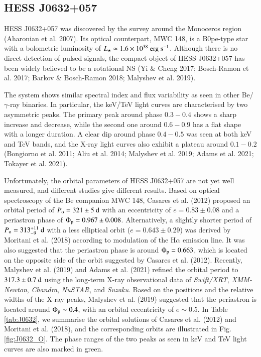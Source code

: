 \documentclass{aa}
\def\HESSJ0632{HESS J0632+057}
\begin{document}
\subsection{\HESSJ0632}
\HESSJ0632 was discovered by the survey around the Monoceros region (Aharonian et al. 2007). Its optical counterpart, MWC 148, is a B0pe-type star with a bolometric luminosity of $L_{\star}\simeq1.6\times10^{38}\ {\rm erg\ s^{-1}}$.
Although there is no direct detection of pulsed signals, the compact object of \HESSJ0632 has been widely believed to be a rotational NS (Yi \& Cheng 2017; Bosch-Ramon et al. 2017; Barkov \& Bosch-Ramon 2018; Malyshev et al. 2019).

The system shows similar spectral index and flux variability as seen in other Be/$\gamma$-ray binaries. In particular, the keV/TeV light curves are characterised by two asymmetric peaks. The primary peak around phase $0.3-0.4$ shows a sharp increase and decrease, while the second one around $0.6-0.9$ has a flat shape with a longer duration. A clear dip around phase $0.4-0.5$ was seen at both keV and TeV bands, and the X-ray light curves also exhibit a plateau around $0.1-0.2$ (Bongiorno et al. 2011; Aliu et al. 2014; Malyshev et al. 2019; Adams et al. 2021; Tokayer et al. 2021).

Unfortunately, the orbital parameters of \HESSJ0632 are not
yet well measured, and different studies give different results.
Based on optical spectroscopy of the Be companion MWC 148, Casares et al. (2012) proposed an orbital period of $P_{\rm o}=321\pm5\ \rm{d}$ with an eccentricity of $e=0.83\pm0.08$ and a periastron phase of $\Phi_{\rm p}=0.967\pm0.008$. Alternatively, a slightly shorter period of $P_{\rm o}=313^{+11}_{-9}\ \rm{d}$ with a less elliptical orbit ($e=0.643\pm0.29$) was derived by Moritani et al. (2018) according to modulation of the H$\alpha$ emission line. It was also suggested that the periastron phase is around $\Phi_{\rm p}=0.663$, which is located on the opposite side of the orbit suggested by Casares et al. (2012).
Recently, Malyshev et al. (2019) and Adams et al. (2021) refined the orbital period to $317.3\pm0.7\ \rm{d}$ using the long-term X-ray observational data of \textit{Swift/XRT}, \textit{XMM-Newton}, \textit{Chandra}, \textit{NuSTAR}, and \textit{Suzaku}. Based on the positions and the relative widths of the X-ray peaks, Malyshev et al. (2019) suggested that the periastron is located around $\Phi_{\rm p}\sim0.4$, with an orbital eccentricity of $e\sim0.5$. In Table \ref{tab:J0632}, we summarise the orbital solutions of Casares et al. (2012) and Moritani et al. (2018), and the corresponding orbits are illustrated in Fig. \ref{fig:J0632_O}. The phase ranges of the two peaks as seen in keV and TeV light curves are also marked in green.
\end{document}
